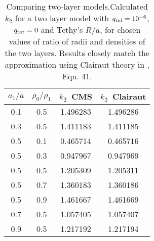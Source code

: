 %

\begin{table}
 \centering   
\caption{Comparing two-layer models.Calculated $k_2$ for a two layer model with $q_{\rm 
tid}=10^{-6}$, $q_{\rm rot}=0$  
and Tethy's $R/a$, for chosen values of ratio of radii and densities of
the two layers. Results closely match the approximation using Clairaut theory in
\citet{folonier2015}, Eqn. 41.
  \label{tab:folonier_table}}
    \begin{tabular}{cccc}
        \hline
    {$a_1/a$}   &  {$\rho_0/\rho_1$}  &  
    {$k_2$~CMS}  &  {$k_2$~Clairaut}  \\
    \hline
0.1       &  0.5             &  1.496283   &  1.496286        \\
0.3       &  0.5             &  1.411183   &  1.411185        \\
0.5       &  0.1             &  0.465714   &  0.465716        \\
0.5       &  0.3             &  0.947967   &  0.947969        \\
0.5       &  0.5             &  1.205309   &  1.205311        \\
0.5       &  0.7             &  1.360183   &  1.360186        \\
0.5       &  0.9             &  1.461667   &  1.461669        \\
0.7       &  0.5             &  1.057405   &  1.057407        \\
0.9       &  0.5             &  1.217192   &  1.217194        \\
\hline
\end{tabular}
\end{table}

